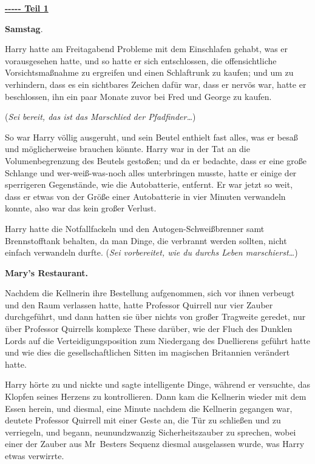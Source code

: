 

\hypertarget{teil-1}{%

\textbf{\uline{-\/-\/-\/-\/- Teil 1}}

\textbf{Samstag}.

Harry hatte am Freitagabend Probleme mit dem Einschlafen gehabt, was er vorausgesehen hatte, und so hatte er sich entschlossen, die offensichtliche Vorsichtsmaßnahme zu ergreifen und einen Schlaftrunk zu kaufen; und um zu verhindern, dass es ein sichtbares Zeichen dafür war, dass er nervös war, hatte er beschlossen, ihn ein paar Monate zuvor bei Fred und George zu kaufen.

(\emph{Sei bereit, das ist das Marschlied der Pfadfinder…})

So war Harry völlig ausgeruht, und sein Beutel enthielt fast alles, was er besaß und möglicherweise brauchen könnte. Harry war in der Tat an die Volumenbegrenzung des Beutels gestoßen; und da er bedachte, dass er eine große Schlange und wer-weiß-was-noch alles unterbringen musste, hatte er einige der sperrigeren Gegenstände, wie die Autobatterie, entfernt. Er war jetzt so weit, dass er etwas von der Größe einer Autobatterie in vier Minuten verwandeln konnte, also war das kein großer Verlust.

Harry hatte die Notfallfackeln und den Autogen-Schweißbrenner samt Brennstofftank behalten, da man Dinge, die verbrannt werden sollten, nicht einfach verwandeln durfte. (\emph{Sei vorbereitet, wie du durchs Leben marschierst…})

\textbf{Mary's Restaurant.}

Nachdem die Kellnerin ihre Bestellung aufgenommen, sich vor ihnen verbeugt und den Raum verlassen hatte, hatte Professor Quirrell nur vier Zauber durchgeführt, und dann hatten sie über nichts von großer Tragweite geredet, nur über Professor Quirrells komplexe These darüber, wie der Fluch des Dunklen Lords auf die Verteidigungsposition zum Niedergang des Duellierens geführt hatte und wie dies die gesellschaftlichen Sitten im magischen Britannien verändert hatte.

Harry hörte zu und nickte und sagte intelligente Dinge, während er versuchte, das Klopfen seines Herzens zu kontrollieren. Dann kam die Kellnerin wieder mit dem Essen herein, und diesmal, eine Minute nachdem die Kellnerin gegangen war, deutete Professor Quirrell mit einer Geste an, die Tür zu schließen und zu verriegeln, und begann, neunundzwanzig Sicherheitszauber zu sprechen, wobei einer der Zauber aus Mr~Besters Sequenz diesmal ausgelassen wurde, was Harry etwas verwirrte.

}
